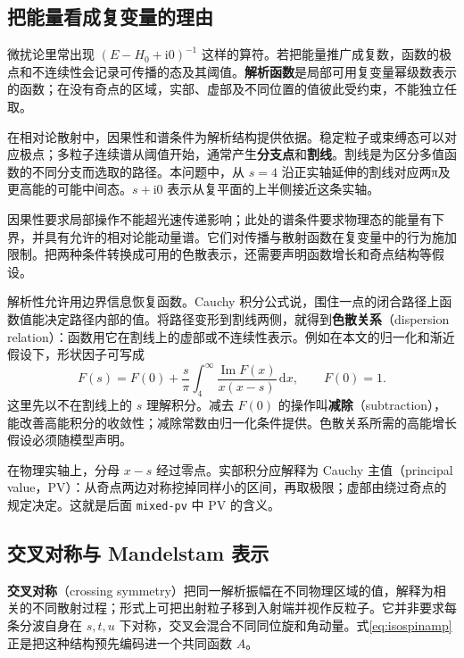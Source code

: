 \documentclass[UTF8,a4paper,11pt,fontset=fandol]{ctexart}
\numberwithin{equation}{section}
\newcommand{\dd}{\,\mathrm d}
\newcommand{\ii}{\mathrm i}
\newcommand{\Imm}{\operatorname{Im}}
\newcommand{\code}[1]{{\urlstyle{tt}\nolinkurl{#1}}}
\begin{document}
\subsection{把能量看成复变量的理由}
微扰论里常出现 \((E-H_0+\ii0)^{-1}\) 这样的算符。若把能量推广成复数，函数的极点和不连续性会记录可传播的态及其阈值。\textbf{解析函数}是局部可用复变量幂级数表示的函数；在没有奇点的区域，实部、虚部及不同位置的值彼此受约束，不能独立任取。

在相对论散射中，因果性和谱条件为解析结构提供依据。稳定粒子或束缚态可以对应极点；多粒子连续谱从阈值开始，通常产生\textbf{分支点}和\textbf{割线}。割线是为区分多值函数的不同分支而选取的路径。本问题中，从 \(s=4\) 沿正实轴延伸的割线对应两π及更高能的可能中间态。\(s+\ii0\) 表示从复平面的上半侧接近这条实轴。

因果性要求局部操作不能超光速传递影响；此处的谱条件要求物理态的能量有下界，并具有允许的相对论能动量谱。它们对传播与散射函数在复变量中的行为施加限制。把两种条件转换成可用的色散表示，还需要声明函数增长和奇点结构等假设。

解析性允许用边界信息恢复函数。Cauchy 积分公式说，围住一点的闭合路径上函数值能决定路径内部的值。将路径变形到割线两侧，就得到\textbf{色散关系}（dispersion relation）：函数用它在割线上的虚部或不连续性表示。例如在本文的归一化和渐近假设下，形状因子可写成
\begin{equation}\label{eq:Fdisp}
F(s)=F(0)+\frac{s}{\pi}\int_4^\infty
\frac{\Imm F(x)}{x(x-s)}\dd x,\qquad F(0)=1.
\end{equation}
这里先以不在割线上的 \(s\) 理解积分。减去 \(F(0)\) 的操作叫\textbf{减除}（subtraction），能改善高能积分的收敛性；减除常数由归一化条件提供。色散关系所需的高能增长假设必须随模型声明。

在物理实轴上，分母 \(x-s\) 经过零点。实部积分应解释为 Cauchy 主值（principal value，PV）：从奇点两边对称挖掉同样小的区间，再取极限；虚部由绕过奇点的规定决定。这就是后面 \code{mixed-pv} 中 PV 的含义。

\subsection{交叉对称与 Mandelstam 表示}
\textbf{交叉对称}（crossing symmetry）把同一解析振幅在不同物理区域的值，解释为相关的不同散射过程；形式上可把出射粒子移到入射端并视作反粒子。它并非要求每条分波自身在 \(s,t,u\) 下对称，交叉会混合不同同位旋和角动量。式\eqref{eq:isospinamp}正是把这种结构预先编码进一个共同函数 \(A\)。
\end{document}

